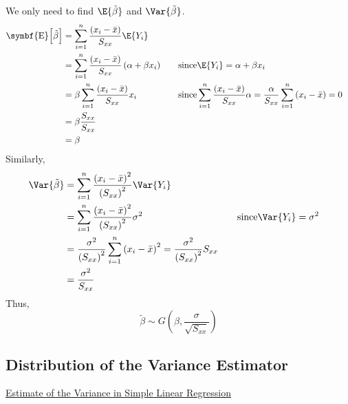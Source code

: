 We only need to find $ \E{\tilde{\beta}} $ and $ \Var{\tilde{\beta}} $.
\[\begin{aligned}
        \symbf{\mathrm{E}}\Bigl[\tilde{\beta}\Bigr]
         & =\sum_{i=1}^{n} \frac{\left(x_{i}-\bar{x}\right)}{S_{x x}} \E{Y_{i}}                                                                                                                                                                                \\
         & =\sum_{i=1}^{n} \frac{\left(x_{i}-\bar{x}\right)}{S_{x x}}\left(\alpha+\beta x_{i}\right) & \quad & \text{since} \E{Y_{i}}=\alpha+\beta x_{i}                                                                                                       \\
         & =\beta \sum_{i=1}^{n} \frac{\left(x_{i}-\bar{x}\right)}{S_{x x}} x_{i}                    &       & \text{since} \sum_{i=1}^{n} \frac{\left(x_{i}-\bar{x}\right)}{S_{x x}} \alpha=\frac{\alpha}{S_{x x}} \sum_{i=1}^{n}\left(x_{i}-\bar{x}\right)=0 \\
         & =\beta \frac{S_{x x}}{S_{x x}}                                                                                                                                                                                                                      \\
         & =\beta
    \end{aligned}
\]
Similarly,
\[\begin{aligned}
        \Var{\tilde{\beta}}
         & =\sum_{i=1}^{n} \frac{\left(x_{i}-\bar{x}\right)^{2}}{\left(S_{x x}\right)^{2}} \Var{Y_{i}}                                                                                                 \\
         & =\sum_{i=1}^{n} \frac{\left(x_{i}-\bar{x}\right)^{2}}{\left(S_{x x}\right)^{2}} \sigma^{2}                                                    & \quad & \text{since} \Var{Y_{i}}=\sigma^{2} \\
         & =\frac{\sigma^{2}}{\left(S_{x x}\right)^{2}} \sum_{i=1}^{n}\left(x_{i}-\bar{x}\right)^{2}=\frac{\sigma^{2}}{\left(S_{x x}\right)^{2}} S_{x x}                                               \\
         & =\frac{\sigma^{2}}{S_{x x}}
    \end{aligned}\]
Thus,
\[\tilde{\beta} \sim G\left(\beta, \frac{\sigma}{\sqrt{S_{x x}}}\right)\]

\subsection{Distribution of the Variance Estimator}
\underline{Estimate of the Variance in Simple Linear Regression}


